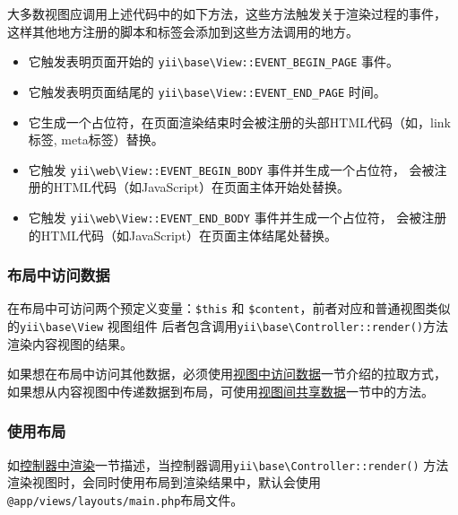 大多数视图应调用上述代码中的如下方法，这些方法触发关于渲染过程的事件，
这样其他地方注册的脚本和标签会添加到这些方法调用的地方。

\begin{itemize}
\item 它触发表明页面开始的 \texttt{yii{\allowbreak{}\textbackslash}base{\allowbreak{}\textbackslash}View\allowbreak{}::\allowbreak{}EVENT\_BEGIN\_PAGE} 事件。


\item 它触发表明页面结尾的 \texttt{yii{\allowbreak{}\textbackslash}base{\allowbreak{}\textbackslash}View\allowbreak{}::\allowbreak{}EVENT\_END\_PAGE} 时间。


\item 它生成一个占位符，在页面渲染结束时会被注册的头部HTML代码（如，link标签, meta标签）替换。


\item 它触发 \texttt{yii{\allowbreak{}\textbackslash}web{\allowbreak{}\textbackslash}View\allowbreak{}::\allowbreak{}EVENT\_BEGIN\_BODY} 事件并生成一个占位符，
会被注册的HTML代码（如JavaScript）在页面主体开始处替换。


\item 它触发 \texttt{yii{\allowbreak{}\textbackslash}web{\allowbreak{}\textbackslash}View\allowbreak{}::\allowbreak{}EVENT\_END\_BODY} 事件并生成一个占位符，
会被注册的HTML代码（如JavaScript）在页面主体结尾处替换。


\end{itemize}
\subsubsection{布局中访问数据 \label{structure-views.md::accessing-data-in-layouts}}
在布局中可访问两个预定义变量：\lstinline|$this| 和 \lstinline|$content|，前者对应和普通视图类似的\texttt{yii{\allowbreak{}\textbackslash}base{\allowbreak{}\textbackslash}View} 视图组件
后者包含调用\texttt{yii{\allowbreak{}\textbackslash}base{\allowbreak{}\textbackslash}Controller\allowbreak{}::\allowbreak{}render()}方法渲染内容视图的结果。

如果想在布局中访问其他数据，必须使用\hyperref[structure-views.md::::accessing-data-in-views]{视图中访问数据}一节介绍的拉取方式，
如果想从内容视图中传递数据到布局，可使用\hyperref[structure-views.md::::sharing-data-among-views]{视图间共享数据}一节中的方法。

\subsubsection{使用布局 \label{structure-views.md::using-layouts}}
如\hyperref[structure-views.md::::rendering-in-controllers]{控制器中渲染}一节描述，当控制器调用\texttt{yii{\allowbreak{}\textbackslash}base{\allowbreak{}\textbackslash}Controller\allowbreak{}::\allowbreak{}render()}
方法渲染视图时，会同时使用布局到渲染结果中，默认会使用\lstinline|@app/views/layouts/main.php|布局文件。

